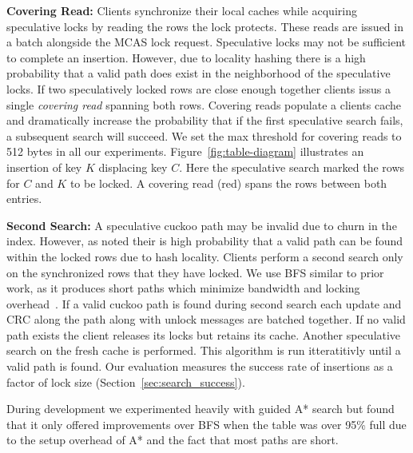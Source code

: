 \textbf{Covering Read:} Clients synchronize their local
caches while acquiring speculative locks by reading the rows
the lock protects. These reads are issued in a batch
alongside the MCAS lock request. Speculative locks may not
be sufficient to complete an insertion. However, due to
locality hashing there is a high probability that a valid
path does exist in the neighborhood of the speculative
locks. If two speculatively locked rows are close enough
together clients issus a single \textit{covering read}
spanning both rows. Covering reads populate a clients cache
and dramatically increase the probability that if the first
speculative search fails, a subsequent search will succeed.
We set the max threshold for covering reads to 512 bytes in
all our experiments.  Figure~\ref{fig:table-diagram}
illustrates an insertion of key $K$ displacing key $C$. Here
the speculative search marked the rows for $C$ and $K$ to be
locked. A covering read (red) spans the rows between both
entries.

\textbf{Second Search:} A speculative cuckoo path may be
invalid due to churn in the index. However, as noted their
is high probability that a valid path can be found within
the locked rows due to hash locality. Clients perform a
second search only on the synchronized rows that they have
locked. We use BFS similar to prior work, as it produces
short paths which minimize bandwidth and locking
overhead~\cite{cuckoo-improvements}. If a valid cuckoo path
is found during second search each update and CRC along the
path along with unlock messages are batched together. If no
valid path exists the client releases its locks but retains
its cache. Another speculative search on the fresh cache is
performed. This algorithm is run itteratitivly until a valid
path is found. Our evaluation measures the success rate of
insertions as a factor of lock size
(Section~\ref{sec:search_success}).

During development we
experimented heavily with guided A* search but found that it
only offered improvements over BFS when the table was over
95\% full due to the setup overhead of A* and the fact that
most paths are short.


